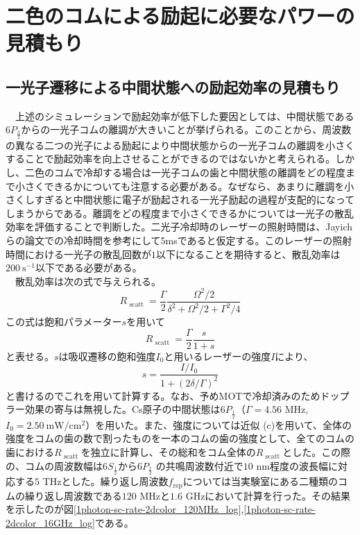 \documentclass[uplatex, dvipdfmx, a4paper, report, papersize, 11pt]{jsbook}
\begin{document}
\section{二色のコムによる励起に必要なパワーの見積もり}
\subsection{一光子遷移による中間状態への励起効率の見積もり}
　上述のシミュレーションで励起効率が低下した要因としては、中間状態である$6P_{\frac{3}{2}}$からの一光子コムの離調が大きいことが挙げられる。このことから、周波数の異なる二つの光子による励起により中間状態からの一光子コムの離調を小さくすることで励起効率を向上させることができるのではないかと考えられる。しかし、二色のコムで冷却する場合は一光子コムの歯と中間状態の離調をどの程度まで小さくできるかについても注意する必要がある。なぜなら、あまりに離調を小さくしすぎると中間状態に電子が励起される一光子励起の過程が支配的になってしまうからである。離調をどの程度まで小さくできるかについては一光子の散乱効率を評価することで判断した。二光子冷却時のレーザーの照射時間は、Jayichらの論文での冷却時間を参考にして5msであると仮定する。このレーザーの照射時間における一光子の散乱回数が$1$以下になることを期待すると、散乱効率は$200\ \mathrm{s^{-1}}$以下である必要がある。\\
　散乱効率は次の式で与えられる。
\begin{equation}
  R _ { \text { scatt } } = \frac { \Gamma } { 2 } \frac { \Omega ^ { 2 } / 2 } { \delta ^ { 2 } + \Omega ^ { 2 } / 2 + \Gamma ^ { 2 } / 4 }
\end{equation}
この式は飽和パラメーター$s$を用いて
\begin{equation}
  R _ { \text { scatt } } = \frac { \Gamma } { 2 } \frac{s}{1+s}
\end{equation}
と表せる。$s$は吸収遷移の飽和強度$I_0$と用いるレーザーの強度$I$により、
\begin{equation}
  s = \frac{I/I_0}{1+(2\delta/\Gamma)^2}
\end{equation}
と書けるのでこれを用いて計算する\cite{ノーベル賞と分光学}。なお、予めMOTで冷却済みのためドップラー効果の寄与は無視した。Cs原子の中間状態は$6P_{\frac{1}{2}}$（$\Gamma = 4.56$ MHz,\ $I_0 = 2.50 \mathrm{\ mW/cm^2}$）を用いた\cite{CsDLine}。また、強度については近似 (c)を用いて、全体の強度をコムの歯の数で割ったものを一本のコムの歯の強度として、全てのコムの歯における$R _ { \text { scatt } }$を独立に計算し、その総和をコム全体の$R _ { \text { scatt } }$とした。この際の、コムの周波数幅は$6S_{\frac{1}{2}}$から$6P_{\frac{1}{2}}$
の共鳴周波数付近で$10$ nm程度の波長幅に対応する$5$ THzとした。繰り返し周波数$f_{\mathrm{rep}}$については当実験室にある二種類のコムの繰り返し周波数である$120$ MHzと$1.6$ GHzにおいて計算を行った。その結果を示したのが図\ref{1photon-sc-rate-2dcolor_120MHz_log},\ref{1photon-sc-rate-2dcolor_16GHz_log}である。\\
\end{document}
